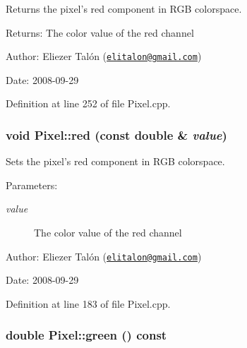 Returns the pixel's red component in RGB colorspace. 

\begin{Desc}
\item[Returns:]The color value of the red channel\end{Desc}
\begin{Desc}
\item[Author:]Eliezer Talón (\href{mailto:elitalon@gmail.com}{\tt elitalon@gmail.com}) \end{Desc}
\begin{Desc}
\item[Date:]2008-09-29 \end{Desc}


Definition at line 252 of file Pixel.cpp.\hypertarget{class_pixel_5866609b8a50e1266aa7c90b0085ec73}{
\subsubsection[red]{\setlength{\rightskip}{0pt plus 5cm}void Pixel::red (const double \& {\em value})}}
\label{class_pixel_5866609b8a50e1266aa7c90b0085ec73}


Sets the pixel's red component in RGB colorspace. 

\begin{Desc}
\item[Parameters:]
\begin{description}
\item[{\em value}]The color value of the red channel\end{description}
\end{Desc}
\begin{Desc}
\item[Author:]Eliezer Talón (\href{mailto:elitalon@gmail.com}{\tt elitalon@gmail.com}) \end{Desc}
\begin{Desc}
\item[Date:]2008-09-29 \end{Desc}


Definition at line 183 of file Pixel.cpp.\hypertarget{class_pixel_71606a21fe4efc55a5ce5bb318b629f7}{
\subsubsection[green]{\setlength{\rightskip}{0pt plus 5cm}double Pixel::green () const}}
\label{class_pixel_71606a21fe4efc55a5ce5bb318b629f7}


